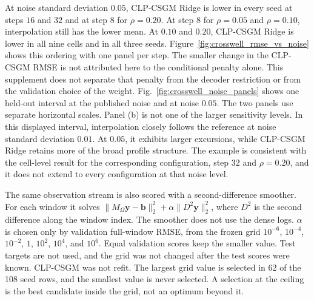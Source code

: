 \begin{table}[htbp]
  \centering
  \caption{Interpolation versus CLP-CSGM Ridge when only the measurement-noise
  standard deviation changes. RMSE values are means over the three paper
  seeds. Wins count seeds in which CLP-CSGM Ridge has strictly lower RMSE.
  The held-out $V_c$ standard deviation is $0.035$, on the same scale as the
  noise. Noise $0.05$ is about $1.43$ times that deviation. Noise levels
  $0.10$ and $0.20$ are about $2.86$ and $5.71$ times that deviation.
  These noise levels were used for sensitivity analysis and were not
  calibrated to field measurement uncertainties. The decoder and the
  dense-log map are fit once per
  step and seed, and the penalty is selected on validation at each noise
  level. Noise $0.01$ in this table is that refit. At $0.20$ some selected
  weights equal $100$, the largest candidate on this grid, which is not an
  optimum outside the grid.}
  \label{tab:crosswell_noise_sweep}
  \small
\end{table}

At noise standard deviation $0.05$, CLP-CSGM Ridge is lower in every seed at
steps $16$ and $32$ and at step $8$ for $\rho=0.20$. At step $8$ for
$\rho=0.05$ and $\rho=0.10$, interpolation still has the lower mean.
At $0.10$ and $0.20$, CLP-CSGM Ridge is lower in all nine cells and in all
three seeds. Figure~\ref{fig:crosswell_rmse_vs_noise} shows this ordering
with one panel per step. The smaller change in the CLP-CSGM RMSE is not
attributed here to the conditional penalty alone. This supplement does not
separate that penalty from the decoder restriction or from the validation
choice of the weight.
Fig.~\ref{fig:crosswell_noise_panels} shows one held-out interval at the
published noise and at noise $0.05$. The two panels use separate horizontal
scales. Panel (b) is not one of the larger sensitivity levels. In this
displayed interval, interpolation closely follows the reference at noise
standard deviation $0.01$. At $0.05$, it exhibits larger excursions, while
CLP-CSGM Ridge retains more of the broad profile structure. The example is
consistent with the cell-level result for the corresponding configuration,
step $32$ and $\rho=0.20$, and it does not extend to every configuration at
that noise level.

The same observation stream is also scored with a second-difference smoother.
For each window it solves
$\|M_{\Omega}\boldsymbol{y}-\boldsymbol{b}\|_2^2+\alpha\|D^{2}\boldsymbol{y}\|_2^2$,
where $D^{2}$ is the second difference along the window index. The smoother
does not use the dense logs. $\alpha$ is chosen only by validation
full-window RMSE, from the frozen grid
$10^{-6}$, $10^{-4}$, $10^{-2}$, $1$, $10^{2}$, $10^{4}$, and $10^{6}$.
Equal validation scores keep the smaller value. Test targets are not used,
and the grid was not changed after the test scores were known. CLP-CSGM was
not refit. The largest grid value is selected in 62 of the 108 seed rows,
and the smallest value is never selected. A selection at the ceiling is the
best candidate inside the grid, not an optimum beyond it.

